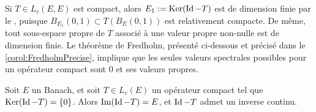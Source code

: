 Si $T\in L_c(E,E)$ est compact, alors $E_1 := \operatorname{Ker}(\operatorname{Id}-T)$ est de dimension finie par le , puisque $B_{E_1}(0,1) \subset T(B_E(0,1))$ est relativement compacte. De même, tout sous-espace propre de $T$ associé à une valeur propre non-nulle est de dimension finie. Le théorème de Fredholm, présenté ci-dessous et précisé dans le \cref{corol:FredholmPrecise}, implique que les seules valeurs spectrales possibles pour un opérateur compact sont $0$ et ses valeurs propres.

\begin{theorem}[Fredholm]
\label{th:Fredholm}
%
	Soit $E$ un Banach, et soit $T \in L_c(E)$ un opérateur compact tel que $\operatorname{Ker}(\operatorname{Id}-T) = \{0\}$. Alors $\operatorname{Im}(\operatorname{Id}-T) = E$, et $\operatorname{Id}-T$ admet un inverse continu.
\end{theorem}

